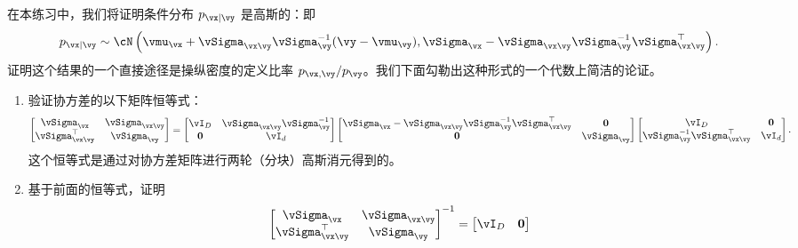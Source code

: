 \documentclass[../../book-main_zh.tex]{subfiles}
\begin{document}
\begin{exercise}
  在本练习中，我们将证明条件分布 $p_{\vx \mid
  \vy}$ 是高斯的：即
  \begin{equation}\label{eq:gaussian-conditional-eqn}
    p_{\vx \mid \vy} \sim \cN\left(
      \vmu_{\vx} + \vSigma_{\vx\vy} \vSigma_{\vy}^{-1} (\vy - \vmu_{\vy}),
      \vSigma_{\vx} - \vSigma_{\vx\vy} \vSigma_{\vy}^{-1}
      \vSigma_{\vx\vy}^{\top}
    \right).
  \end{equation}
  证明这个结果的一个直接途径是操纵密度的定义比率 $p_{\vx, \vy} / p_{\vy}$。我们下面勾勒出这种形式的一个代数上简洁的论证。

  \begin{enumerate}
    \item 验证协方差的以下矩阵恒等式：
      \begin{equation}\label{eq:gaussian-conditional-covariance-block}
        \begin{bmatrix}
          \vSigma_{\vx} & \vSigma_{\vx\vy} \\
          \vSigma_{\vx\vy}^\top & \vSigma_{\vy}
        \end{bmatrix}
        =
        \begin{bmatrix}
          \vI_D & \vSigma_{\vx\vy}\vSigma_{\vy}^{-1} \\
          \Zero & \vI_d
        \end{bmatrix}
        \begin{bmatrix}
          \vSigma_{\vx} - \vSigma_{\vx\vy} \vSigma_{\vy}^{-1}
          \vSigma_{\vx\vy}^{\top} & \Zero \\
          \Zero & \vSigma_{\vy}
        \end{bmatrix}
        \begin{bmatrix}
          \vI_D & \Zero\\
          \vSigma_{\vy}^{-1}\vSigma_{\vx\vy}^\top & \vI_d
        \end{bmatrix}.
      \end{equation}
      这个恒等式是通过对协方差矩阵进行两轮（分块）高斯消元得到的。
    \item 基于前面的恒等式，证明
      \begin{equation}\label{eq:gaussian-conditional-covariance-inverse-block}
        \begin{bmatrix}
          \vSigma_{\vx} & \vSigma_{\vx\vy} \\
          \vSigma_{\vx\vy}^\top & \vSigma_{\vy}
        \end{bmatrix}^{-1}
        =
        \begin{bmatrix}
          \vI_D & \Zero\\

\end{bmatrix}
\end{equation}
\end{enumerate}
\end{exercise}
\end{document}
